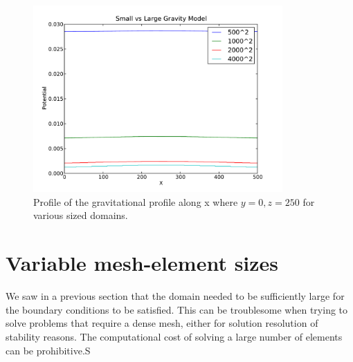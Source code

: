 \begin{figure}[htp]
\centering
\includegraphics[width=0.85\textwidth]{figures/ex10p_boundeff.pdf}
\caption{Profile of the gravitational profile along x where $y=0,z=250$ for
various sized domains.}
\label{fig:ex10p}
\end{figure}
\clearpage

% 
% 

\section{Variable mesh-element sizes}
We saw in a previous section that the domain needed to be sufficiently
large for the boundary conditions to be satisfied. This can be troublesome when
trying to solve problems that require a dense mesh, either for solution
resolution of stability reasons. The computational cost of solving a large
number of elements can be prohibitive.S

